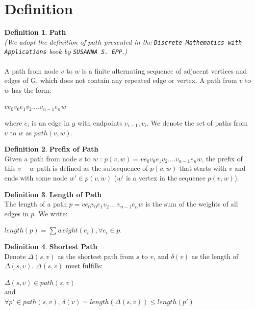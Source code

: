 \documentclass[11pt, oneside]{article}   	%
\newcommand\tab[1][1cm]{\hspace*{#1}}
\theoremstyle{definition}
\newtheorem{definition}{Definition}[section]
\begin{document}
\section{Definition}
\theoremstyle{definition}
\begin{definition}\textbf{Path}\\
\textit{(We adopt the definition of $path$ presented in the \texttt{Discrete Mathematics with Applications} book by \texttt{SUSANNA S. EPP}.)}
\\\\
A path from node $v$ to $w$ is a finite alternating sequence of adjacent vertices and edges of G, which does not contain any repeated edge or vertex. A path from $v$ to $w$ has the form: 
\begin{center}
 $ve_0v_0e_1v_2....v_{n-1}e_nw$ 
\end{center}
where $e_i$ is an edge in $g$ with endpoints $v_{i-1}, v_i$. We denote the set of paths from $v$ to $w$ as $path(v, w)$.
\end{definition}
\tab
\begin{definition}\textbf{Prefix of Path}\\
Given a path from node $v$ to $w$ : $p(v, w) = ve_0v_0e_1v_2....v_{n-1}e_nw$, the prefix of this $v-w$ path is defined as the subsequence of $p(v, w)$ that starts with $v$ and ends with some node $w' \in p(v, w)$ ($w'$ is a vertex in the sequence $p(v, w)$). 
\end{definition}
\tab
\begin{definition}\textbf{Length of Path} \\
The length of a path $p = ve_0v_0e_1v_2....v_{n-1}e_nw$ is the sum of the weights of all edges in $p$. We write: 
\begin{center}
  $length(p) = \sum weight(e_i), \forall e_i \in p$. 
\end{center} 
\end{definition}
\tab
\begin{definition}\textbf{Shortest Path}\\
Denote $\Delta(s, v)$ as the shortest path from $s$ to $v$, and $\delta(v)$ as the length of $\Delta(s, v)$. $\Delta(s, v)$ must fulfills: 
\begin{center}
$\Delta(s, v) \in path(s, v)$ 
\\
and 
\\
$\forall p' \in path(s, v)$, $\delta(v) = length(\Delta(s, v)) \leq length(p')$
\end{center}
\end{definition}
\end{document}
